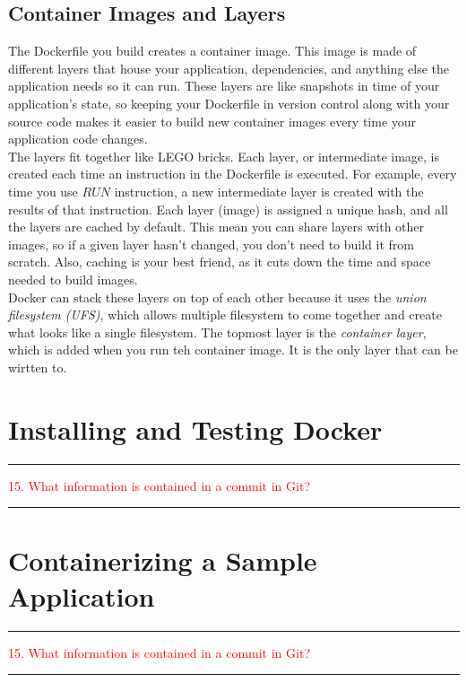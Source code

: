 \documentclass{article}
\begin{document}
\subsection{Container Images and Layers}
The Dockerfile you build creates a container image. This image is made of different layers that house your application, dependencies, and anything else the application needs so it can run. These layers are like snapshots in time of your application's state, so keeping your Dockerfile in version control along with your source code makes it easier to build new container images every time your application code changes. \\
The layers fit together like LEGO bricks. Each layer, or intermediate image, is created each time an instruction in the Dockerfile is executed. For example, every time you use $RUN$ instruction, a new intermediate layer is created with the results of that instruction. Each layer (image) is assigned a unique hash, and all the layers are cached by default.  This mean you can share layers with other images, so if  a given layer hasn't changed, you don't need to build it from scratch. Also, caching is your best friend, as it cuts down the time and space needed to build images. \\
Docker can stack these layers on top of each other because it uses the \textit{union filesystem (UFS)}, which allows multiple filesystem to come together and create what looks like a single filesystem. The topmost layer is the \textit{container layer}, which is added when you run teh container image. It is the only layer that can be wirtten to. 
\section{Installing and Testing Docker}
\noindent
{\color{red} \rule{\linewidth}{0.5mm}}
\textcolor{red}{15. What information is contained in a commit  in Git?} \\
\noindent
{\color{red} \rule{\linewidth}{0.5mm}}
\section{Containerizing a Sample Application}
\noindent
{\color{red} \rule{\linewidth}{0.5mm}}
\textcolor{red}{15. What information is contained in a commit  in Git?} \\
\noindent
{\color{red} \rule{\linewidth}{0.5mm}}
\end{document}
